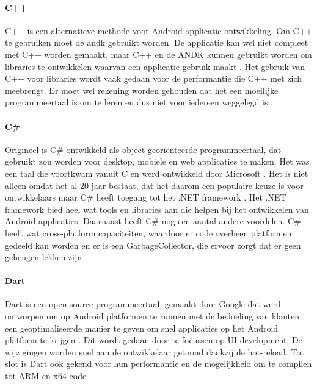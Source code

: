 \paragraph{C++}
C++ is een alternatieve methode voor Android applicatie ontwikkeling. Om C++ te gebruiken 
moet de \acrshort{andk} gebruikt worden. De applicatie kan wel niet compleet 
met C++ worden gemaakt, maar C++ en de ANDK kunnen gebruikt worden om libraries te ontwikkelen 
waarvan een applicatie gebruik maakt \autocite{harkiran2022}. Het gebruik van C++ voor libraries wordt 
vaak gedaan voor de performantie die C++ met zich meebrengt. Er moet wel rekening worden 
gehouden dat het een moeilijke programmeertaal is om te leren en dus niet voor iedereen weggelegd is 
\autocite{Designveloper2022}.

\paragraph{C\#}\label{pa:csharp}
Origineel is C\# ontwikkeld als object-georiënteerde programmeertaal, dat gebruikt zou 
worden voor desktop, mobiele en web applicaties te maken. Het was een taal die voortkwam 
vanuit C en werd ontwikkeld door Microsoft \autocite{Designveloper2022}. Het is niet alleen 
omdat het al 20 jaar bestaat, dat het daarom een populaire keuze is voor ontwikkelaars 
maar C\# heeft toegang tot het .NET framework \autocite{Kesavan2021}. Het .NET framework 
bied heel wat tools en libraries aan die helpen bij het ontwikkelen van Android applicaties. 
Daarnaast heeft C\# nog een aantal andere voordelen. C\# heeft wat cross-platform 
capaciteiten, waardoor er code overheen platformen gedeeld kan worden en er is een 
\gls{GarbageCollector}, die ervoor zorgt dat er geen geheugen lekken zijn \autocite{Patel2023}.

\paragraph{Dart}
Dart is een open-source programmeertaal, gemaakt door Google dat werd ontworpen om op 
Android platformen te runnen \autocite{Kesavan2021} met de bedoeling van klanten een 
geoptimaliseerde manier te geven om snel applicaties op het Android platform te krijgen 
\autocite{harkiran2022}. Dit wordt gedaan door te focussen op UI development. De wijzigingen 
worden snel aan de ontwikkelaar getoond dankzij de hot-reload. Tot slot is Dart ook gekend 
voor hun performantie en de mogelijkheid om te compilen tot ARM en x64 code \autocite{harkiran2022}.

